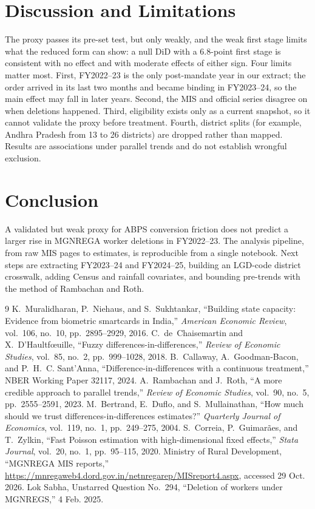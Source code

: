 \documentclass[10pt,twocolumn,letterpaper]{article}
\begin{document}
\section{Discussion and Limitations}
The proxy passes its pre-set test, but only weakly, and the weak first stage limits what the reduced form can show: a null DiD with a 6.8-point first stage is consistent with no effect and with moderate effects of either sign. Four limits matter most. First, FY2022--23 is the only post-mandate year in our extract; the order arrived in its last two months and became binding in FY2023--24, so the main effect may fall in later years. Second, the MIS and official series disagree on when deletions happened. Third, eligibility exists only as a current snapshot, so it cannot validate the proxy before treatment. Fourth, district splits (for example, Andhra Pradesh from 13 to 26 districts) are dropped rather than mapped. Results are associations under parallel trends and do not establish wrongful exclusion.

\section{Conclusion}
A validated but weak proxy for ABPS conversion friction does not predict a larger rise in MGNREGA worker deletions in FY2022--23. The analysis pipeline, from raw MIS pages to estimates, is reproducible from a single notebook. Next steps are extracting FY2023--24 and FY2024--25, building an LGD-code district crosswalk, adding Census and rainfall covariates, and bounding pre-trends with the method of Rambachan and Roth.

\balance
\begin{thebibliography}{9}\footnotesize
{} K.~Muralidharan, P.~Niehaus, and S.~Sukhtankar, ``Building state capacity: Evidence from biometric smartcards in India,'' \emph{American Economic Review}, vol.~106, no.~10, pp.~2895--2929, 2016.
 C.~de~Chaisemartin and X.~D'Haultf{\oe}uille, ``Fuzzy differences-in-differences,'' \emph{Review of Economic Studies}, vol.~85, no.~2, pp.~999--1028, 2018.
 B.~Callaway, A.~Goodman-Bacon, and P.~H.~C. Sant'Anna, ``Difference-in-differences with a continuous treatment,'' NBER Working Paper 32117, 2024.
 A.~Rambachan and J.~Roth, ``A more credible approach to parallel trends,'' \emph{Review of Economic Studies}, vol.~90, no.~5, pp.~2555--2591, 2023.
 M.~Bertrand, E.~Duflo, and S.~Mullainathan, ``How much should we trust differences-in-differences estimates?'' \emph{Quarterly Journal of Economics}, vol.~119, no.~1, pp.~249--275, 2004.
 S.~Correia, P.~Guimar\~aes, and T.~Zylkin, ``Fast Poisson estimation with high-dimensional fixed effects,'' \emph{Stata Journal}, vol.~20, no.~1, pp.~95--115, 2020.
 Ministry of Rural Development, ``MGNREGA MIS reports,'' \url{https://mnregaweb4.dord.gov.in/netnregarep/MISreport4.aspx}, accessed 29 Oct. 2026.
 Lok Sabha, Unstarred Question No.~294, ``Deletion of workers under MGNREGS,'' 4 Feb. 2025.
\end{thebibliography}
\end{document}
